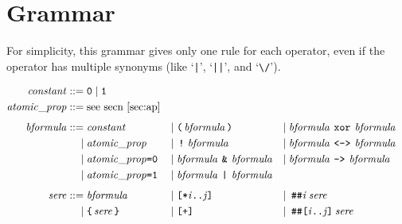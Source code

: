 \documentclass[a4paper,twoside,10pt,DIV=12]{scrreprt}
\DeclareMathOperator{\NOT}{\texttt{!}}
\newcommand{\XOR}{\mathbin{\texttt{xor}}}
\newcommand{\IMPLIES}{\mathbin{\texttt{->}}}
\newcommand{\EQUIV}{\mathbin{\texttt{<->}}}
\newcommand{\OR}{\mathbin{\texttt{|}}}
\newcommand{\AND}{\mathbin{\texttt{\&}}}
\newcommand{\DELAY}[1]{\mathbin{\texttt{\#\##1}}}
\newcommand{\DELAYR}[1]{\mathbin{\texttt{\#\#[#1]}}}
\newcommand{\0}{\texttt{0}}
\newcommand{\1}{\texttt{1}}
\newcommand{\STAR}[1]{\texttt{[*#1]}}
\newcommand{\PLUS}{\texttt{[+]}}
\newcommand\mvar[1]{\ensuremath{\mathit{#1}}}
\newcommand\code[1]{\texttt{#1}}
\newcommand\samp[1]{`\texttt{#1}'}
\newcommand\tsamp[1]{\text{\texttt{#1}}}
\newcommand\msamp[1]{#1}
\begin{document}
\chapter{Grammar}

For simplicity, this grammar gives only one rule for each
operator, even if the operator has multiple synonyms (like \samp{|},
\samp{||}, and {`\verb=\/='}).

\begin{align*}
\mathit{constant} ::={}     & \0 \mid \1                                                                                                                                                                                                       \\
\mathit{atomic\_prop} ::={} & \text{see secn~\ref{sec:ap}}                                                                                                                                                                                     \\[1ex]
  \mathit{bformula} ::={}   & \mathit{constant}                                      & \mid{} & \tsamp{(}\,\mathit{bformula}\,\tsamp{)}                    & \mid{} & \mathit{bformula}\,\msamp{\XOR}\,\mathit{bformula}                       \\
  \mid{}                    & \mathit{atomic\_prop}                                  & \mid{} & \msamp{\NOT}\,\mathit{bformula}                            & \mid{} & \mathit{bformula}\,\msamp{\EQUIV}\,\mathit{bformula}                     \\
  \mid{}                    & \mathit{atomic\_prop}\code{=0}                         & \mid{} & \mathit{bformula}\,\msamp{\AND}\,\mathit{bformula}         & \mid{} & \mathit{bformula}\,\msamp{\IMPLIES}\,\mathit{bformula}                   \\
  \mid{}                    & \mathit{atomic\_prop}\code{=1}                         & \mid{} & \mathit{bformula}\,\msamp{\OR}\,\mathit{bformula}                                                                                              \\[1ex]
\mathit{sere} ::={}         & \mathit{bformula}                                      & \mid{} & \msamp{\STAR{\mvar{i}..\mvar{j}}}                          & \mid{} & \DELAY{\mvar{i}}\mathit{sere}                                            \\
  \mid{}                    & \tsamp{\{}\,\mathit{sere}\,\tsamp{\}}                  & \mid{} & \msamp{\PLUS{}}                                            & \mid{} & \DELAYR{\mvar{i}..\mvar{j}}\mathit{sere}                                 \\

\end{align*}
\end{document}
